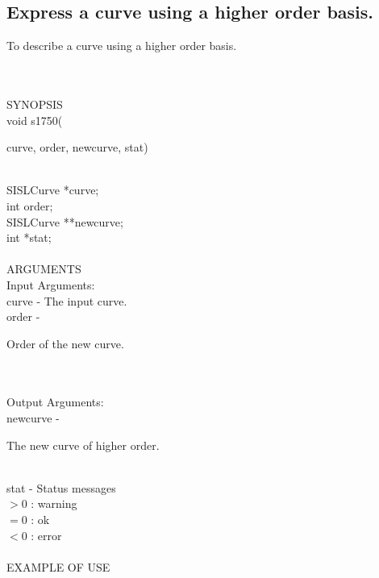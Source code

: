 \subsection{Express a curve using a higher order basis.}
\begin{minipg1}
  To describe a curve using a higher order basis.
\end{minipg1} \\ \\
SYNOPSIS\\
        \>void s1750(\begin{minipg3}
        {\fov curve}, {\fov order}, {\fov newcurve}, {\fov stat})
                \end{minipg3}\\[0.3ex]
                \>\>    SISLCurve       \>      *{\fov curve};\\
                \>\>    int     \>      {\fov order};\\
                \>\>    SISLCurve       \>      **{\fov newcurve};\\
                \>\>    int     \>      *{\fov stat};\\
\\
ARGUMENTS\\
        \>Input Arguments:\\
        \>\>    {\fov curve}    \> - \> The input curve.\\
        \>\>    {\fov order}    \> - \> \begin{minipg2}
                                Order of the new curve.
                                \end{minipg2}\\
\\
        \>Output Arguments:\\
        \>\>    {\fov newcurve}\> - \>\begin{minipg2}
                                The new curve of higher order.
                                \end{minipg2}\\
        \>\>    {\fov stat}     \> - \> Status messages\\
                \>\>\>\>\>              $> 0$   : warning\\
                \>\>\>\>\>              $= 0$   : ok\\
                \>\>\>\>\>              $< 0$   : error\\
\\
EXAMPLE OF USE\\
